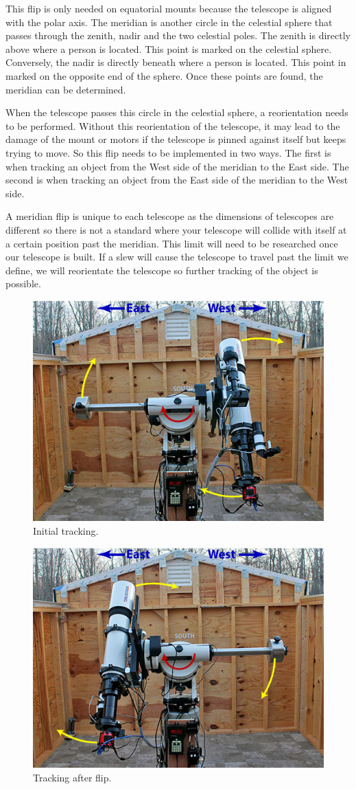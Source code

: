 \documentclass[12pt]{article}
\begin{document}
This flip is only needed on equatorial mounts because the telescope is aligned with the polar axis. The meridian is another circle in the celestial sphere that passes through the zenith, nadir and the two celestial poles. The zenith is directly above where a person is located. This point is marked on the celestial sphere. Conversely, the nadir is directly beneath where a person is located. This point in marked on the opposite end of the sphere. Once these points are found, the meridian can be determined.

When the telescope passes this circle in the celestial sphere, a reorientation needs to be performed. Without this reorientation of the telescope, it may lead to the damage of the mount or motors if the telescope is pinned against itself but keeps trying to move. So this flip needs to be implemented in two ways. The first is when tracking an object from the West side of the meridian to the East side. The second is when tracking an object from the East side of the meridian to the West side.

A meridian flip is unique to each telescope as the dimensions of telescopes are different so there is not a standard where your telescope will collide with itself at a certain position past the meridian. This limit will need to be researched once our telescope is built. If a slew will cause the telescope to travel past the limit we define, we will reorientate the telescope so further tracking of the object is possible.

\clearpage

\begin{figure}[h]
  \centering
  \includegraphics[width=0.6\linewidth]{beforeflip}
  \caption{Initial tracking.}
  \label{fig:beforeflip}
\end{figure}

\begin{figure}[h]
  \centering
  \includegraphics[width=0.6\linewidth]{afterflip}
  \caption{Tracking after flip.}
  \label{fig:afterflip}
\end{figure}
\end{document}
